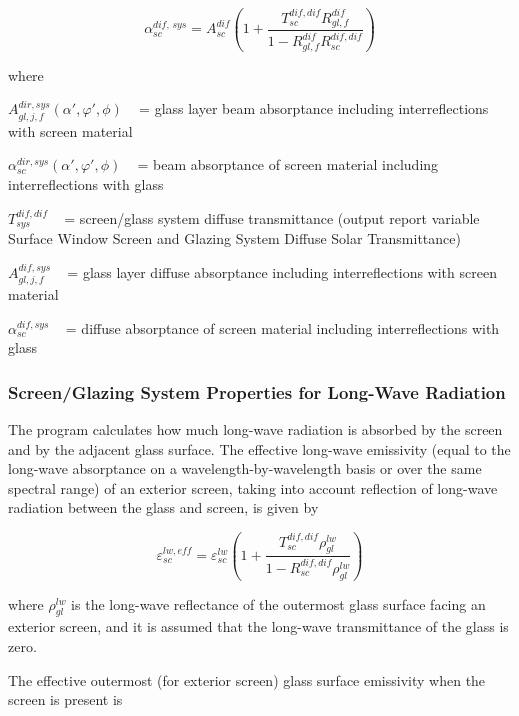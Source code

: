 \begin{equation}
\alpha_{sc}^{dif,\,sys} = A_{sc}^{dif}\left( {1 + \frac{{T_{sc}^{dif,dif}R_{gl,f}^{dif}}}{{1 - R_{gl,f}^{dif}R_{sc}^{dif,dif}}}} \right)
\end{equation}

where

\(A_{gl,j,f}^{dir,sys}\left( {\alpha ',\varphi ',\phi } \right)\) ~ = glass layer beam absorptance including interreflections with screen material

\(\alpha_{sc}^{dir,sys}\left( {\alpha ',\varphi ',\phi } \right)\) ~ = beam absorptance of screen material including interreflections with glass

\(T_{sys}^{dif,dif}\) ~ = screen/glass system diffuse transmittance (output report variable Surface Window Screen and Glazing System Diffuse Solar Transmittance)

\(A_{gl,j,f}^{dif,sys}\) ~ = glass layer diffuse absorptance including interreflections with screen material

\(\alpha_{sc}^{dif,sys}\) ~ = diffuse absorptance of screen material including interreflections with glass

\subsubsection{Screen/Glazing System Properties for Long-Wave Radiation}\label{screenglazing-system-properties-for-long-wave-radiation}

The program calculates how much long-wave radiation is absorbed by the screen and by the adjacent glass surface. The effective long-wave emissivity (equal to the long-wave absorptance on a wavelength-by-wavelength basis or over the same spectral range) of an exterior screen, taking into account reflection of long-wave radiation between the glass and screen, is given by

\begin{equation}
\varepsilon_{sc}^{lw,eff} = \varepsilon_{sc}^{lw}\left( {1 + \frac{{T_{sc}^{dif,dif}\rho_{gl}^{lw}}}{{1 - R_{sc}^{dif,dif}\rho_{gl}^{lw}}}} \right)
\end{equation}

where \(\rho_{gl}^{lw}\) is the long-wave reflectance of the outermost glass surface facing an exterior screen, and it is assumed that the long-wave transmittance of the glass is zero.

The effective outermost (for exterior screen) glass surface emissivity when the screen is present is

